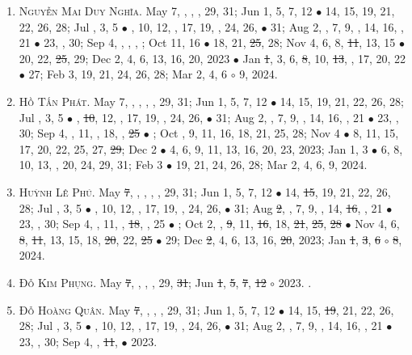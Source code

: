 \documentclass{article}
\begin{document}
\begin{enumerate}
	\item \textsc{Nguyễn Mai Duy Nghĩa.} May 7, , , , 29, 31; Jun 1, 5, 7, 12 $\bullet$ 14, 15, 19, 21, 22, 26, 28; Jul , 3, 5 $\bullet$ , 10, 12, , 17, 19, , 24, 26,  $\bullet$ 31; Aug 2, , 7, 9, , 14, 16, , 21 $\bullet$ 23, , 30; Sep 4, , , , ; Oct 11, 16 $\bullet$ 18, 21, \st{25}, 28; Nov 4, 6, 8, \st{11}, 13, 15 $\bullet$ 20, 22, \st{25}, 29; Dec 2, 4, 6, 13, 16, 20, 2023 $\bullet$ Jan \st{1}, 3, 6, \st{8}, 10, \st{13}, , 17, 20, 22 $\bullet$ 27; Feb 3, 19, 21, 24, 26, 28; Mar 2, 4, 6 $\circ$ 9, 2024.
	\item \textsc{Hồ Tấn Phát.} May 7, , , , , 29, 31; Jun 1, 5, 7, 12 $\bullet$ 14, 15, 19, 21, 22, 26, 28; Jul , 3, 5 $\bullet$ , \st{10}, 12, , 17, 19, , 24, 26,  $\bullet$ 31; Aug 2, , 7, 9, , 14, 16, , 21 $\bullet$ 23, , 30; Sep 4, , 11, , 18, , \st{25} $\bullet$ ; Oct , 9, 11, 16, 18, 21, 25, 28; Nov 4 $\bullet$ 8, 11, 15, 17, 20, 22, 25, 27, \st{29}; Dec 2 $\bullet$ 4, 6, 9, 11, 13, 16, 20, 23, 2023; Jan 1, 3 $\bullet$ 6, 8, 10, 13, , 20, 24, 29, 31; Feb 3 $\bullet$ 19, 21, 24, 26, 28; Mar 2, 4, 6, 9, 2024.
	\item \textsc{Huỳnh Lê Phú.} May \st{7}, , , , , 29, 31; Jun 1, 5, 7, 12 $\bullet$ 14, \st{15}, 19, 21, 22, 26, 28; Jul , 3, 5 $\bullet$ , 10, 12, , 17, 19, , 24, 26,  $\bullet$ 31; Aug \st{2}, , 7, 9, , 14, \st{16}, , 21 $\bullet$ 23, , 30; Sep 4, , 11, , \st{18}, , 25 $\bullet$ ; Oct 2, , \st{9}, 11, \st{16}, 18, \st{21}, \st{25}, \st{28} $\bullet$ Nov 4, 6, \st{8}, \st{11}, 13, 15, 18, \st{20}, 22, \st{25} $\bullet$ 29; Dec \st{2}, 4, 6, 13, 16, \st{20}, 2023; Jan \st{1}, \st{3}, \st{6} $\circ$ \st{8}, 2024. {\sf[Out]}
	\item \textsc{Đỗ Kim Phụng.} May \st{7}, , , , 29, \st{31}; Jun \st{1}, \st{5}, \st{7}, \st{12} $\circ$ 2023. {}. {\sf[Out]}
	\item \textsc{Đỗ Hoàng Quân.} May \st{7}, , , , 29, 31; Jun 1, 5, 7, 12 $\bullet$ 14, 15, \st{19}, 21, 22, 26, 28; Jul , 3, 5 $\bullet$ , 10, 12, , 17, 19, , 24, 26,  $\bullet$ 31; Aug 2, , 7, 9, , 14, 16, , 21 $\bullet$ 23, , 30; Sep 4, , \st{11},  $\bullet$ 2023. {\sf[Out]}

\end{enumerate}
\end{document}
